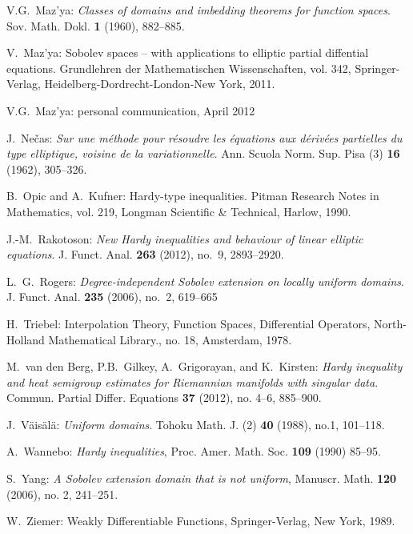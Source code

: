 \documentclass[10pt,leqno]{amsart}
\theoremstyle{definition}
\numberwithin{equation}{section}
\begin{document}
\begin{thebibliography}{11}
V.G.~Maz'ya: \emph{Classes of domains and imbedding theorems for function spaces}.
Sov. Math. Dokl. {\bf 1} (1960), 882--885.

V.~Maz'ya: Sobolev spaces -- with applications to elliptic partial
diffential
equations. Grundlehren der Mathematischen Wissenschaften, vol. 342,
Springer-Verlag, Heidelberg-Dordrecht-London-New York, 2011.

V.G.~Maz'ya: personal communication, April 2012

J.~Ne\v cas: \emph{Sur une m\'ethode pour r\'esoudre les \'equations aux
d\'eriv\'ees partielles du type elliptique, voisine de la variationnelle}.
Ann. Scuola Norm. Sup. Pisa (3) {\bf 16} (1962), 305--326.

B.~Opic and A.~Kufner: Hardy-type inequalities. Pitman Research
Notes in Mathematics, vol. 219, Longman Scientific \& Technical, Harlow, 1990. 

J.-M.~Rakotoson: \emph{New Hardy inequalities and behaviour of linear elliptic
equations}. J. Funct. Anal. {\bf 263} (2012), no.~9, 2893--2920.

L.~G.~Rogers: \emph{Degree-independent {S}obolev extension on locally
uniform domains}. J. Funct. Anal. {\bf 235} (2006), no.~2, 619--665

H.~Triebel: Interpolation Theory, Function Spaces, Differential Operators,
North-Holland Mathematical Library., no. 18, Amsterdam, 1978.

M.~van den Berg, P.B.~Gilkey, A.~Grigorayan, and K.~Kirsten: \emph{Hardy
inequality and heat semigroup estimates for Riemannian manifolds with singular
data}. Commun. Partial Differ. Equations {\bf 37} (2012), no. 4--6, 885--900.

J.~V\"ais\"al\"a: \emph{Uniform domains}. Tohoku Math. J. (2) {\bf 40} (1988),
no.1, 101--118.

A.~Wannebo: \emph{Hardy inequalities}, Proc. Amer. Math. Soc. {\bf 109} (1990)
85--95.

S.~Yang: \emph{A Sobolev extension domain that is not uniform}, Manuscr. Math.
{\bf 120}  (2006), no. 2,  241--251.
 
W.~Ziemer: Weakly Differentiable Functions, Springer-Verlag, New York, 1989.
\end{thebibliography}
\end{document}
